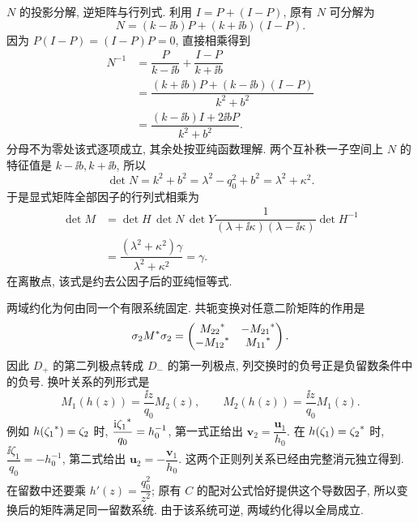 \par\smallskip\noindent $N$ 的投影分解, 逆矩阵与行列式.\quad
利用 $I=P+(I-P)$, 原有 $N$ 可分解为
\begin{equation*}
N=(k-\ii b)P+(k+\ii b)(I-P).
\end{equation*}
因为 $P(I-P)=(I-P)P=0$, 直接相乘得到
\begin{equation*}
\begin{aligned}
N^{-1}
&=\dfrac{P}{k-\ii b}+\dfrac{I-P}{k+\ii b}\\
&=\dfrac{(k+\ii b)P+(k-\ii b)(I-P)}{k^2+b^2}\\
&=\dfrac{(k-\ii b)I+2\ii bP}{k^2+b^2}.
\end{aligned}
\end{equation*}
分母不为零处该式逐项成立, 其余处按亚纯函数理解.
两个互补秩一子空间上 $N$ 的特征值是 $k-\ii b,k+\ii b$,
所以
\begin{equation*}
\det N=k^2+b^2
=\lambda^2-q_0^2+b^2
=\lambda^2+\kappa^2.
\end{equation*}
于是显式矩阵全部因子的行列式相乘为
\begin{equation*}
\begin{aligned}
\det M
&=\det H\,\det N\,\det Y
\dfrac{1}{(\lambda+\ii\kappa)(\lambda-\ii\kappa)}\det H^{-1}\\
&=\dfrac{(\lambda^2+\kappa^2)\gamma}{\lambda^2+\kappa^2}
=\gamma.
\end{aligned}
\end{equation*}
在离散点, 该式是约去公因子后的亚纯恒等式.

\par\smallskip\noindent 两域约化为何由同一个有限系统固定.\quad
共轭变换对任意二阶矩阵的作用是
\begin{equation*}
\sigma_2{M}^{*}\sigma_2
=\begin{pmatrix}
{M_{22}}^{*}&-{M_{21}}^{*}\\
-{M_{12}}^{*}&{M_{11}}^{*}
\end{pmatrix}.
\end{equation*}
因此 $D_+$ 的第二列极点转成 $D_-$ 的第一列极点,
列交换时的负号正是负留数条件中的负号.
换叶关系的列形式是
\begin{equation*}
M_1(h(z))=\dfrac{\ii z}{q_0}M_2(z),\qquad
M_2(h(z))=\dfrac{\ii z}{q_0}M_1(z).
\end{equation*}
例如 $h({\zeta_1}^{*})=\zeta_2$ 时,
$\dfrac{\mathrm{i}{\zeta_1}^{*}}{q_0}=h_0^{-1}$,
第一式正给出 $\mathbf v_2=\dfrac{\mathbf u_1}{h_0}$.
在 $h(\zeta_1)={\zeta_2}^{*}$ 时,
$\dfrac{\ii\zeta_1}{q_0}=-h_0^{-1}$,
第二式给出 $\mathbf u_2=-\dfrac{\mathbf v_1}{h_0}$.
这两个正则列关系已经由完整消元独立得到.
在留数中还要乘 $h'(z)=\dfrac{q_0^2}{z^2}$;
原有 $C$ 的配对公式恰好提供这个导数因子,
所以变换后的矩阵满足同一留数系统.
由于该系统可逆, 两域约化得以全局成立.

